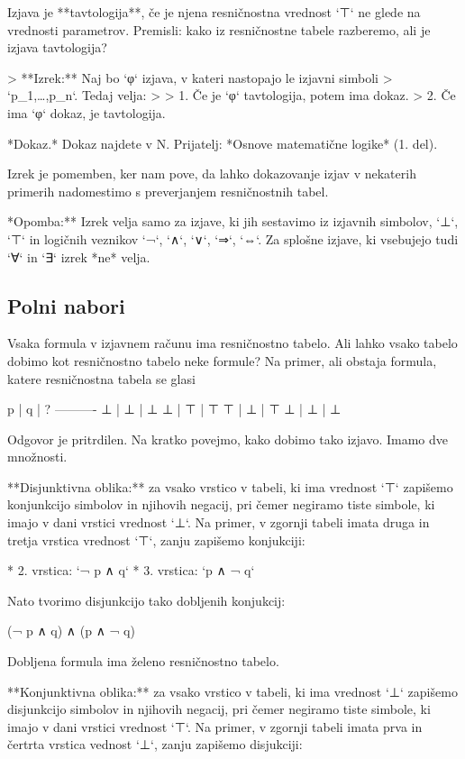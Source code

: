 Izjava je **tavtologija**, če je njena resničnostna vrednost `⊤` ne glede na
vrednosti parametrov. Premisli: kako iz resničnostne tabele razberemo, ali je
izjava tavtologija?

> **Izrek:** Naj bo `φ` izjava, v kateri nastopajo le izjavni simboli
> `p_1,…,p_n`. Tedaj velja:
>
> 1. Če je `φ` tavtologija, potem ima dokaz.
> 2. Če ima `φ` dokaz, je tavtologija.

*Dokaz.* Dokaz najdete v N. Prijatelj: *Osnove matematične logike* (1. del).

Izrek je pomemben, ker nam pove, da lahko dokazovanje izjav v nekaterih primerih
nadomestimo s preverjanjem resničnostnih tabel.

*Opomba:** Izrek velja samo za izjave, ki jih sestavimo iz izjavnih simbolov,
`⊥`, `⊤` in logičnih veznikov `¬`, `∧`, `∨`, `⇒`, `⇔`. Za splošne izjave, ki
vsebujejo tudi `∀` in `∃` izrek *ne* velja.

\subsection{Polni nabori}

Vsaka formula v izjavnem računu ima resničnostno tabelo. Ali lahko vsako tabelo
dobimo kot resničnostno tabelo neke formule? Na primer, ali obstaja formula,
katere resničnostna tabela se glasi

    p | q | ?
    ----------
    ⊥ | ⊥ | ⊥
    ⊥ | ⊤ | ⊤
    ⊤ | ⊥ | ⊤
    ⊥ | ⊥ | ⊥

Odgovor je pritrdilen. Na kratko povejmo, kako dobimo tako izjavo. Imamo dve
množnosti.

**Disjunktivna oblika:** za vsako vrstico v tabeli, ki ima vrednost `⊤` zapišemo
konjunkcijo simbolov in njihovih negacij, pri čemer negiramo tiste simbole, ki
imajo v dani vrstici vrednost `⊥`. Na primer, v zgornji tabeli imata druga in
tretja vrstica vrednost `⊤`, zanju zapišemo konjukciji:

* 2. vrstica: `¬ p ∧ q`
* 3. vrstica: `p ∧ ¬ q`

Nato tvorimo disjunkcijo tako dobljenih konjukcij:

    (¬ p ∧ q) ∧ (p ∧ ¬ q)

Dobljena formula ima želeno resničnostno tabelo.

**Konjunktivna oblika:** za vsako vrstico v tabeli, ki ima vrednost `⊥` zapišemo
disjunkcijo simbolov in njihovih negacij, pri čemer negiramo tiste simbole, ki
imajo v dani vrstici vrednost `⊤`. Na primer, v zgornji tabeli imata prva in
čertrta vrstica vednost `⊥`, zanju zapišemo disjukciji:

